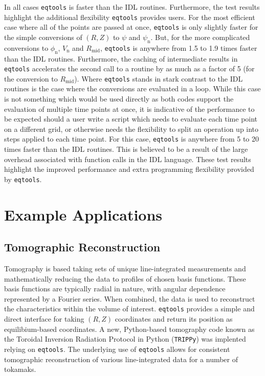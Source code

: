 \documentclass[12pt,floatfix,showpacs]{revtex4-1}
\newcommand{\eqtools}{\texttt{eqtools}\xspace}
\newcommand{\TRIPPy}{\texttt{TRIPPy}\xspace}
\begin{document}
In all cases \eqtools is faster than the IDL routines.
Furthermore, the test results highlight the additional flexibility \eqtools provides users.
For the most efficient case where all of the points are passed at once, \eqtools is only slightly faster for the simple conversions of $(R, Z)$ to $\psi$ and $\psi_{\text{n}}$.
But, for the more complicated conversions to $\phi_{\text{n}}$, $V_{\text{n}}$ and $R_{\text{mid}}$, \eqtools is anywhere from 1.5 to 1.9 times faster than the IDL routines.
Furthermore, the caching of intermediate results in \eqtools accelerates the second call to a routine by as much as a factor of 5 (for the conversion to $R_{\text{mid}}$).
Where \eqtools stands in stark contrast to the IDL routines is the case where the conversions are evaluated in a loop.
While this case is not something which would be used directly as both codes support the evaluation of multiple time points at once, it is indicative of the performance to be expected should a user write a script which needs to evaluate each time point on a different grid, or otherwise needs the flexibility to split an operation up into steps applied to each time point.
For this case, \eqtools is anywhere from 5 to 20 times faster than the IDL routines.
This is believed to be a result of the large overhead associated with function calls in the IDL language.
These test results highlight the improved performance and extra programming flexibility provided by \eqtools.

\section{Example Applications}
\label{sec:examples}

\subsection{Tomographic Reconstruction}

Tomography is based taking sets of unique line-integrated measurements and mathematically reducing the data to profiles of chosen basis functions.
These basis functions are typically radial in nature, with angular dependence represented by a Fourier series.
When combined, the data is used to reconstruct the characteristics within the volume of interest.
\eqtools provides a simple and direct interface for taking $(R, Z)$ coordinates and return its position as equilibium-based coordinates.
A new, Python-based tomography code known as the Toroidal Inversion Radiation Protocol in Python (\TRIPPy) was implented relying on \eqtools.
The underlying use of \eqtools allows for consistent tomographic reconstruction of various line-integrated data for a number of tokamaks.
\end{document}
